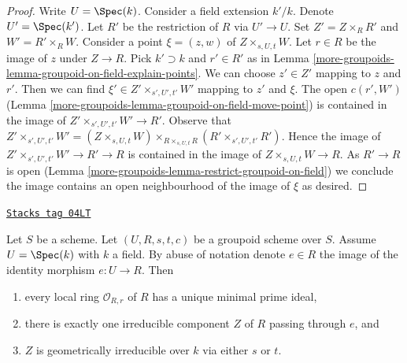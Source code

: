 \begin{proof}
Write $U = \Spec(k)$. Consider a field extension $k'/k$. Denote
$U' = \Spec(k')$. Let $R'$ be the restriction of $R$ via $U' \to U$.
Set $Z' = Z \times_R R'$ and $W' = R' \times_R W$.
Consider a point $\xi = (z, w)$ of $Z \times_{s, U, t} W$.
Let $r \in R$ be the image of $z$ under $Z \to R$.
Pick $k' \supset k$ and $r' \in R'$ as in
Lemma \ref{more-groupoids-lemma-groupoid-on-field-explain-points}.
We can choose $z' \in Z'$ mapping to $z$ and $r'$.
Then we can find $\xi' \in Z' \times_{s', U', t'} W'$
mapping to $z'$ and $\xi$. The open $c(r', W')$
(Lemma \ref{more-groupoids-lemma-groupoid-on-field-move-point}) is
contained in the image of $Z' \times_{s', U', t'} W' \to R'$.
Observe that $Z' \times_{s', U', t'} W' = (Z \times_{s, U, t} W)
\times_{R \times_{s, U, t} R} (R' \times_{s', U', t'} R')$.
Hence the image of $Z' \times_{s', U', t'} W' \to R' \to R$
is contained in the image of $Z \times_{s, U, t} W \to R$.
As $R' \to R$ is open (Lemma \ref{more-groupoids-lemma-restrict-groupoid-on-field})
we conclude the image contains an open neighbourhood of
the image of $\xi$ as desired.
\end{proof}

\begin{lemma}
\label{more-groupoids-lemma-groupoid-on-field-geometrically-irreducible}
\href{https://stacks.math.columbia.edu/tag/04LT}{\texttt{Stacks tag 04LT}}

Let $S$ be a scheme. Let $(U, R, s, t, c)$ be a groupoid scheme
over $S$. Assume $U = \Spec(k)$ with $k$ a field.
By abuse of notation denote $e \in R$ the image of the identity
morphism $e : U \to R$. Then
\begin{enumerate}
\item every local ring $\mathcal{O}_{R, r}$ of $R$ has a unique
minimal prime ideal,
\item there is exactly one irreducible component $Z$ of $R$
passing through $e$, and
\item $Z$ is geometrically irreducible over $k$ via either
$s$ or $t$.
\end{enumerate}
\end{lemma}

